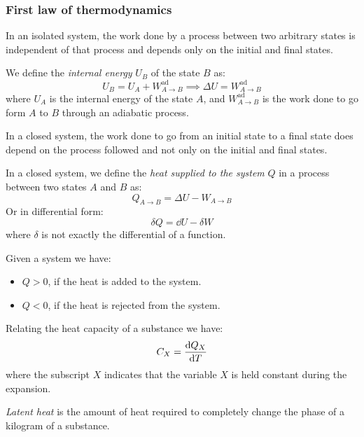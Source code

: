\documentclass[../../../main_physics.tex]{subfiles}
\begin{document}
\begin{multicols}{2}
  \subsubsection{First law of thermodynamics}
  \begin{law}
    In an isolated system, the work done by a process between two arbitrary states is independent of that process and depends only on the initial and final states.
  \end{law}
  \begin{corollary}
    We define the \emph{internal energy} $U_B$ of the state $B$ as:
    $$U_B=U_A+W_{A\to B}^\text{ad}\implies \Delta U=W_{A\to B}^\text{ad}$$
    where $U_A$ is the internal energy of the state $A$, and $W_{A\to B}^\text{ad}$ is the work done to go form $A$ to $B$ through an adiabatic process.
  \end{corollary}
  \begin{law}
    In a closed system, the work done to go from an initial state to a final state does depend on the process followed and not only on the initial and final states.
  \end{law}
  \begin{corollary}
    In a closed system, we define the \emph{heat supplied to the system} $Q$ in a process between two states $A$ and $B$ as:
    $$Q_{A\to B}=\Delta U-W_{A\to B}$$
    Or in differential form:
    $$\delta Q=\dd{U}-\delta W$$
    where $\delta$ is not exactly the differential of a function.
  \end{corollary}
  \begin{lemma}
    Given a system we have:
    \begin{itemize}
      \item $Q>0$, if the heat is added to the system.
      \item $Q<0$, if the heat is rejected from the system.
    \end{itemize}
  \end{lemma}
  \begin{definition}
    Relating the heat capacity of a substance we have: $$C_X=\dv{Q_X}{T}$$
    where the subscript $X$ indicates that the variable $X$ is held constant during the expansion.
  \end{definition}
  \begin{definition}
    \emph{Latent heat} is the amount of heat required to completely change the phase of a kilogram of a substance.

\end{definition}
\end{multicols}
\end{document}

